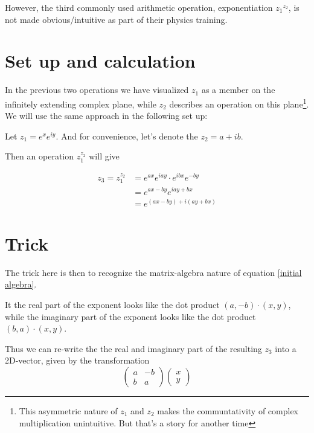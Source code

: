 \documentclass[a4paper, 12pt]{article}
\begin{document}
However, the third commonly used arithmetic operation, exponentiation ${z_1}^{z_2}$, is not made obvious/intuitive as part of their physics training.


\section{Set up and calculation}
In the previous two operations we have visualized $z_1$ as a member on the infinitely extending complex plane, while $z_2$ describes an operation on this plane\footnote{This asymmetric nature of $z_1$ and $z_2$ makes the communtativity of complex multiplication unintuitive. But that's a story for another time}. We will use the same approach in the following set up:

Let $z_1= e^{x} e^{iy}$. And for convenience, let's denote the $z_2 = a+ib$.

Then an operation $z_1^{z_2}$ will give 
    
\begin{align}
z_3 = z_1^{z_2}  & = e^{ax} e^{iay} \cdot e^{ibx} e^{-by}\\
                & = e^{ax - by} e^{iay + bx} \\
                & = e^{(ax-by) +i (ay+bx)} \label{initial algebra}
\end{align}

\section{Trick}
The trick here is then to recognize the matrix-algebra nature of equation \ref{initial algebra}.

It the real part of the exponent looks like the dot product $ (a, -b) \cdot (x, y)$, while
the imaginary part of the exponent looks like the dot product $(b, a) \cdot (x, y)$.

Thus we can re-write the the real and imaginary part of the resulting $z_3$ into a 2D-vector, given by the transformation
\begin{equation}
\begin{pmatrix}
a & -b\\
b & a
\end{pmatrix}
\begin{pmatrix}
x\\
y
\end{pmatrix}\label{transformation equation}
\end{equation}
\end{document}
